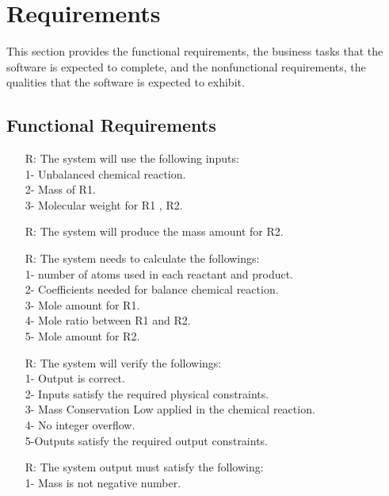 \documentclass[12pt]{article}
\newcounter{reqnum} %
\begin{document}
\section{Requirements}

This section provides the functional requirements, the business tasks that the
software is expected to complete, and the nonfunctional requirements, the
qualities that the software is expected to exhibit.

\subsection{Functional Requirements}

\noindent \begin{itemize}

\item[R\refstepcounter{reqnum}\thereqnum \label{R_Inputs}:] The system will use
  the following inputs:\\
1- Unbalanced chemical reaction.\\
2- Mass of R1.\\
3- Molecular weight for R1 , R2.\\

\item[R\refstepcounter{reqnum}\thereqnum \label{R_OutputInputs}:]  The system
  will produce the mass amount for R2. \\

\item[R\refstepcounter{reqnum}\thereqnum \label{R_Calculate}:] The system needs
  to calculate the followings:\\
1- number of atoms used in each reactant and product.\\
2- Coefficients needed for balance chemical reaction.\\
3- Mole  amount for R1.\\
4- Mole ratio between R1 and R2.\\
5- Mole amount for R2.\\
\item[R\refstepcounter{reqnum}\thereqnum \label{R_VerifyOutput}:] The system will verify the followings:\\
1- Output is correct.\\
2-  Inputs satisfy the required physical constraints.\\
3- Mass Conservation Low applied in the chemical reaction.\\
4- No integer overflow. \\
5-Outputs satisfy the required output constraints.\\

\item[R\refstepcounter{reqnum}\thereqnum \label{R_Output}:] The system output must satisfy the following:\\
   
1- Mass is not negative number.\\

\end{itemize}
\end{document}
